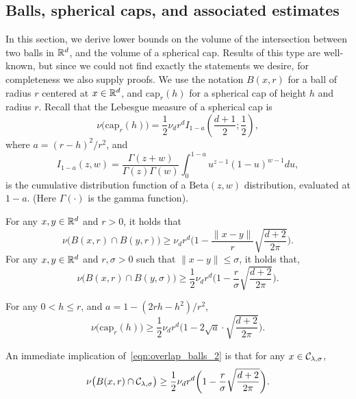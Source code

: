\subsection{Balls, spherical caps, and associated estimates}
\label{subsec:spherical_caps}
In this section, we derive lower bounds on the volume of the intersection between two balls in $\mathbb{R}^d$, and the volume of a spherical cap. Results of this type are well-known, but since we could not find exactly the statements we desire, for completeness we also supply proofs. We use the notation $B(x,r)$ for a ball of radius $r$ centered at $x \in \mathbb{R}^d$, and $\mathrm{cap}_{r}(h)$ for a spherical cap of height $h$ and radius $r$. Recall that the Lebesgue measure of a spherical cap is
\begin{equation*}
\nu\bigl(\mathrm{cap}_r(h)\bigr) = \frac{1}{2} \nu_d r^d I_{1 - a}\left(\frac{d + 1}{2}; \frac{1}{2}\right),
\end{equation*}
where $a = (r - h)^2/r^2$, and
\begin{equation*}
I_{1 - a}(z,w) = \frac{\Gamma(z + w)}{\Gamma(z) \Gamma(w)} \int_{0}^{1 - a} u^{z - 1} (1 - u)^{w - 1} du,
\end{equation*}
is the cumulative distribution function of a $\mathrm{Beta}(z,w)$ distribution, evaluated at $1 - a$. (Here $\Gamma(\cdot)$ is the gamma function).
\begin{lemma}
	\label{lem:overlap_balls}
	For any $x,y \in \mathbb{R}^d$ and $r > 0$, it holds that
	\begin{equation}
	\label{eqn:overlap_balls_1}
	\nu\bigl(B(x,r) \cap B(y,r)\bigr) \geq \nu_d r^d\biggl(1 - \frac{\|x - y\|}{r} \sqrt{\frac{d + 2}{2\pi}}\biggr).
	\end{equation}
	For any $x,y \in \mathbb{R}^d$ and $r,\sigma > 0$ such that $\|x - y\| \leq \sigma$, it holds that,
	\begin{equation}
	\label{eqn:overlap_balls_2}
	\nu\bigl(B(x,r) \cap B(y,\sigma)\bigr) \geq \frac{1}{2} \nu_d r^d\biggl(1 - \frac{r}{\sigma}\sqrt{\frac{d + 2}{2\pi}}\biggr).
	\end{equation}
\end{lemma}
\begin{lemma}
	\label{lem:volume_of_spherical_cap}
	For any $0 < h \leq r$, and $a = 1 - (2 r h - h^2)/r^2$,
	\begin{equation*}
	\nu\bigl(\mathrm{cap}_r(h)\bigr) \geq \frac{1}{2}\nu_dr^d\biggl(1 - 2\sqrt{a} \cdot \sqrt{\frac{d + 2}{2\pi}}\biggr).
	\end{equation*}
\end{lemma}
An immediate implication of~\eqref{eqn:overlap_balls_2} is that for any $x \in \mathcal{C}_{\lambda,\sigma}$,
\begin{equation}
\label{eqn:uniform_local_conductance}
\nu\bigl(B(x,r) \cap \mathcal{C}_{\lambda,\sigma}\bigr) \geq \frac{1}{2} \nu_d r^d\biggl(1 - \frac{r}{\sigma}\sqrt{\frac{d + 2}{2\pi}}\biggr).
\end{equation}  
